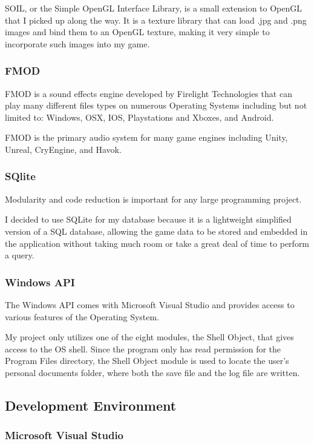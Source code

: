 \documentclass{article}
\begin{document}
SOIL, or the Simple OpenGL Interface Library, is a small extension to OpenGL that I picked up along the way. It is a texture library that can load .jpg and .png images and bind them to an OpenGL texture, making it very simple to incorporate such images into my game.

\subsubsection{FMOD}

FMOD is a sound effects engine developed by Firelight Technologies that can play many different files types on numerous Operating Systems including but not limited to: Windows, OSX, IOS, Playstations and Xboxes, and Android.

FMOD is the primary audio system for many game engines including Unity, Unreal, CryEngine, and Havok.  

\subsubsection{SQlite}

Modularity and code reduction is important for any large programming project. 

I decided to use SQLite for my database because it is a lightweight simplified version of a SQL database, allowing the game data to be stored and embedded in the application without taking much room or take a great deal of time to perform a query.

\subsubsection{Windows API}

The Windows API comes with Microsoft Visual Studio and provides access to various features of the Operating System.

My project only utilizes one of the eight modules, the Shell Object, that gives access to the OS shell. Since the program only has read permission for the Program Files directory, the Shell Object module is used to locate the user's personal documents folder, where both the save file and the log file are written.

\subsection{Development Environment}

\subsubsection{Microsoft Visual Studio}
\end{document}
